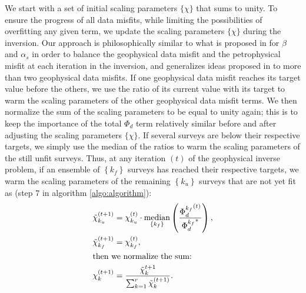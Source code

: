 \documentclass[extra, mreferee]{gji_joint} %
\begin{document}

We start with a set of initial scaling parameters $\{\chi\}$ that sums to unity. To ensure the progress of all data misfits, while limiting the possibilities of overfitting any given term, we update the scaling parameters $\{\chi\}$ during the inversion. Our approach is philosophically similar to what is proposed in \citet{ggz389} for $\beta$ and $\alpha_s$ in order to balance the geophysical data misfit and the petrophysical misfit at each iteration in the inversion, and generalizes ideas proposed in \citet{Lelievre2012} to more than two geophysical data misfits. If one geophysical data misfit reaches its target value before the others, we use the ratio of its current value with its target to warm the scaling parameters of the other geophysical data misfit terms. We then normalize the sum of the scaling parameters to be equal to unity again; this is to keep the importance of the total $\Phi_d$ term relatively similar before and after adjusting the scaling parameters $\{\chi\}$. If several surveys are below their respective targets, we simply use the median of the ratios to warm the scaling parameters of the still unfit surveys. Thus, at any iteration $(t)$ of the geophysical inverse problem, if an ensemble of $\left\{k_f\right\}$ surveys has reached their respective targets, we warm the scaling parameters of the remaining $\left\{k_u\right\}$ surveys that are not yet fit as (step $7$ in algorithm \ref{algo:algorithm}):
\begin{align}
&\tilde{\chi}_{k_u}^{(t+1)} = \chi_{k_u}^{(t)} \cdot \mathop{\hbox{median}}\limits_{\left\{k_f\right\}} \left(\frac{{\Phi_d^{k_f}}^{(t)}}{{\Phi_d^{k_f}}^*}\right) \label{eq:chi_update}, \\
&\tilde{\chi}_{k_f}^{(t+1)} = {\chi}_{k_f}^{(t)}, \\
&\text{then we normalize the sum:} \nonumber \\
&{\chi^{(t+1)}_k} = \frac{\tilde{\chi}_k^{t+1}}{\sum_{k=1}^r \tilde{\chi}_{k}^{(t+1)}} \label{eq:chi_normalizing}.
\end{align}
\end{document}
